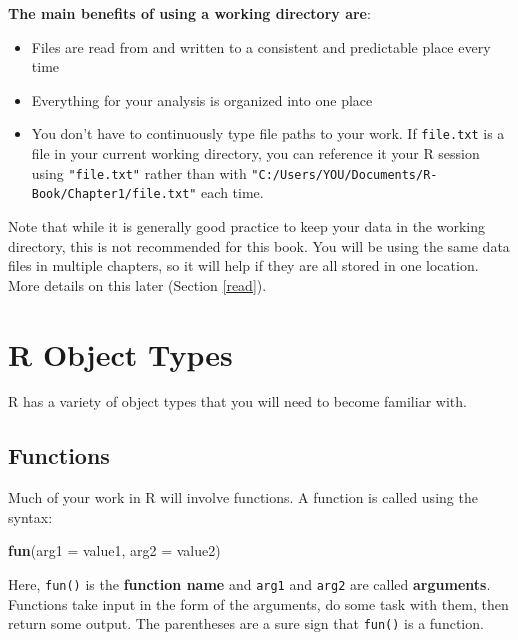 \documentclass[]{book}
\newenvironment{Shaded}{\begin{snugshade}}{\end{snugshade}}
\newcommand{\KeywordTok}[1]{\textcolor[rgb]{0.13,0.29,0.53}{\textbf{#1}}}
\newcommand{\DataTypeTok}[1]{\textcolor[rgb]{0.13,0.29,0.53}{#1}}
\newcommand{\NormalTok}[1]{#1}
\providecommand{\tightlist}{%
  \setlength{\itemsep}{0pt}\setlength{\parskip}{0pt}}
\theoremstyle{definition}
\theoremstyle{definition}
\theoremstyle{definition}
\theoremstyle{remark}
\begin{document}
\textbf{The main benefits of using a working directory are}:

\begin{itemize}
\tightlist
\item
  Files are read from and written to a consistent and predictable place
  every time
\item
  Everything for your analysis is organized into one place
\item
  You don't have to continuously type file paths to your work. If
  \texttt{file.txt} is a file in your current working directory, you can
  reference it your R session using \texttt{"file.txt"} rather than with
  \texttt{"C:/Users/YOU/Documents/R-Book/Chapter1/file.txt"} each time.
\end{itemize}

Note that while it is generally good practice to keep your data in the
working directory, this is not recommended for this book. You will be
using the same data files in multiple chapters, so it will help if they
are all stored in one location. More details on this later (Section
\ref{read}).

\section{R Object Types}\label{r-object-types}

R has a variety of object types that you will need to become familiar
with.

\subsection{Functions}\label{functions}

Much of your work in R will involve functions. A function is called
using the syntax:

\begin{Shaded}
\begin{Highlighting}[]
\KeywordTok{fun}\NormalTok{(}\DataTypeTok{arg1 =}\NormalTok{ value1, }\DataTypeTok{arg2 =}\NormalTok{ value2)}
\end{Highlighting}
\end{Shaded}

Here, \texttt{fun()} is the \textbf{function name} and \texttt{arg1} and
\texttt{arg2} are called \textbf{arguments}. Functions take input in the
form of the arguments, do some task with them, then return some output.
The parentheses are a sure sign that \texttt{fun()} is a function.
\end{document}
